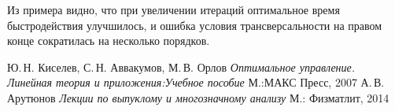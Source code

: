 \documentclass[10pt]{article}
\begin{document}
\begin{figure}[h]
    \centering
    \qquad
\end{figure}

Из примера видно, что при увеличении итераций оптимальное время быстродействия улучшилось, и ошибка условия трансверсальности на правом конце сократилась на несколько порядков.
\newpage

\begin{thebibliography}{0}
Ю.\,Н. Киселев, С.\,Н. Аввакумов, М.\,В. Орлов \emph{Оптимальное управление. Линейная теория и приложения:Учебное пособие} М.:МАКС Пресс, 2007
А.\,В. Арутюнов \emph{Лекции по выпуклому и многозначному анализу} М.: Физматлит, 2014
\end{thebibliography}
\end{document}
